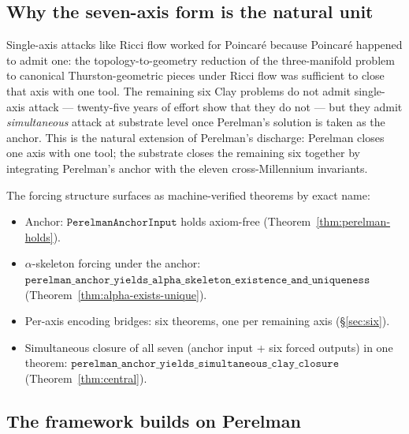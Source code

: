 \documentclass[11pt,a4paper]{article}
\theoremstyle{plain}
\theoremstyle{definition}
\begin{document}
\subsection{Why the seven-axis form is the natural unit}
\label{sec:seven-axis-natural}

Single-axis attacks like Ricci flow worked for Poincar\'e because
Poincar\'e happened to admit one: the topology-to-geometry
reduction of the three-manifold problem to canonical
Thurston-geometric pieces under Ricci flow was sufficient to
close that axis with one tool. The remaining six Clay problems
do not admit single-axis attack --- twenty-five years of effort
show that they do not --- but they admit \emph{simultaneous}
attack at substrate level once Perelman's solution is taken as
the anchor. This is the natural extension of Perelman's discharge:
Perelman closes one axis with one tool; the substrate closes the
remaining six together by integrating Perelman's anchor with the
eleven cross-Millennium invariants.

The forcing structure surfaces as machine-verified theorems by
exact name:

\begin{itemize}[leftmargin=*,nosep]
\item Anchor:
  $\mathtt{PerelmanAnchorInput}$ holds axiom-free
  (Theorem~\ref{thm:perelman-holds}).
\item $\alpha$-skeleton forcing under the anchor:
  $\mathtt{perelman\_anchor\_yields\_alpha\_skeleton\_existence\_and\_uniqueness}$
  (Theorem~\ref{thm:alpha-exists-unique}).
\item Per-axis encoding bridges: six theorems, one per remaining
  axis (\S\ref{sec:six}).
\item Simultaneous closure of all seven (anchor input + six
  forced outputs) in one theorem:
  $\mathtt{perelman\_anchor\_yields\_simultaneous\_clay\_closure}$
  (Theorem~\ref{thm:central}).
\end{itemize}

\subsection{The framework builds on Perelman}
\label{sec:builds-on-perelman}

\noindent{}
\end{document}
